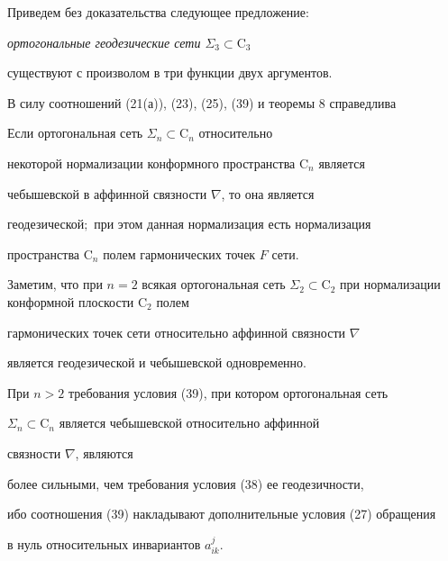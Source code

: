  


Приведем без доказательства следующее предложение: 


{\it ортогональные геодезические сети $\Sigma_3\subset\mathrm C_3$ 


существуют с произволом в три функции двух аргументов.} 


 


В силу соотношений (21(а)), (23), (25), (39) и теоремы 8 справедлива 


 


\begin{thm} 


Если ортогональная сеть $\Sigma_n\subset\mathrm C_n$ относительно 


некоторой нормализации конформного пространства $\mathrm C_n$ является 


чебышевской в аффинной связности $\nabla$, то она является 


геодезической$;$ при этом данная нормализация есть нормализация 


пространства $\mathrm C_n$ полем гармонических точек $F$ сети. 


\end{thm} 


 


 


Заметим, что при $n=2$ всякая ортогональная сеть $\Sigma_2\subset\mathrm 


C_2$ при нормализации конформной плоскости $\mathrm C_2$ полем 


гармонических точек сети относительно аффинной связности $\nabla$ 


является геодезической и чебышевской одновременно. 


 


При $n>2$ требования условия (39), при котором ортогональная сеть 


$\Sigma_n\subset\mathrm C_n$ является чебышевской относительно аффинной 


связности $\nabla$, являются 


более сильными, чем требования условия (38) ее геодезичности, 


ибо соотношения (39) накладывают дополнительные условия (27) обращения 


в нуль относительных инвариантов $a^j_{ik}$. 



